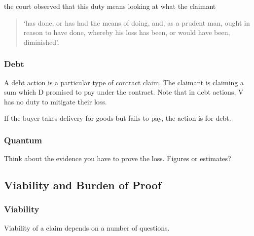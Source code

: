 \documentclass[
]{article}
\newenvironment{Shaded}{}{}
\newcommand{\NormalTok}[1]{#1}
\begin{document}
the court observed that this duty means looking at what the claimant

\begin{quote}
`has done, or has had the means of doing, and, as a prudent man, ought
in reason to have done, whereby his loss has been, or would have been,
diminished'.
\end{quote}

\hypertarget{debt}{%
\subsubsection{Debt}\label{debt}}

A debt action is a particular type of contract claim. The claimant is
claiming a sum which D promised to pay under the contract. Note that in
debt actions, V has no duty to mitigate their loss.

\begin{Shaded}
\begin{Highlighting}[]
\NormalTok{If the buyer takes delivery for goods but fails to pay, the action is for debt.}
\end{Highlighting}
\end{Shaded}

\hypertarget{quantum}{%
\subsubsection{Quantum}\label{quantum}}

Think about the evidence you have to prove the loss. Figures or
estimates?

\hypertarget{viability-and-burden-of-proof}{%
\subsection{Viability and Burden of
Proof}\label{viability-and-burden-of-proof}}

\hypertarget{viability}{%
\subsubsection{Viability}\label{viability}}

Viability of a claim depends on a number of questions.
\end{document}
